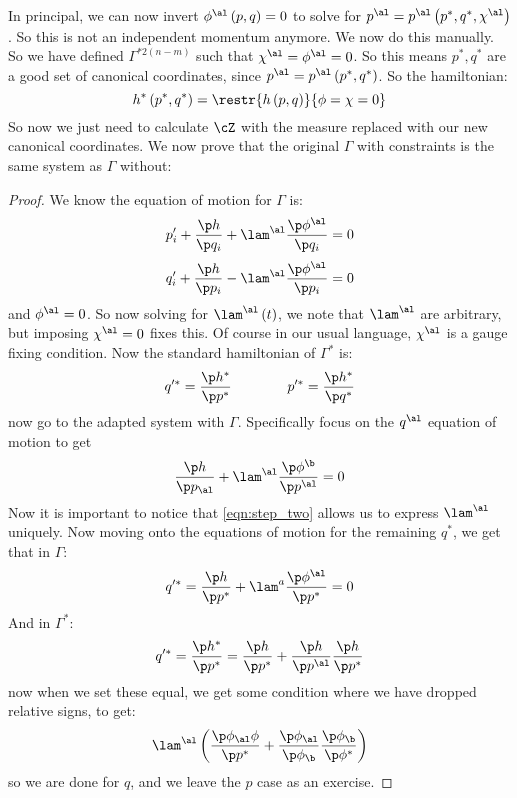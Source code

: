 \documentclass{booc}
\begin{document}
In principal, we can now invert $\phi^\al\left( p , q \right) = 0$ 
to solve for $p^\al = p^\al\left( p^* , q^* , \chi^\al \right)$. 
So this is not an independent momentum anymore.
We now do this manually.
So we have defined $\Gamma^{*2\left( n-m \right)}$ such that
$\chi^\al = \phi^\al = 0$. 
So this means $p^* , q^*$ are a good set of canonical coordinates, since
$p^\al = p^\al\left( p^* , q^* \right)$. 
So the hamiltonian:
\begin{equation}
h^*\left( p^* , q^* \right) = \restr{h\left( p , q \right)}
{\phi = \chi = 0}
\end{equation}
So now we just need to calculate $\cZ$ with the measure replaced with our new canonical coordinates.
We now prove that the original $\Gamma$ with constraints is the same system as $\Gamma$
without:
\begin{proof}
We know the equation of motion for $\Gamma$ is:
\begin{equation}
p_i' + \frac{\p h}{\p q_i} + 
\lam^\al \frac{\p\phi^\al}{\p q_i} = 0
\end{equation}
\begin{equation}
q_i' + \frac{\p h}{\p p_i} - 
\lam^\al \frac{\p \phi^\al}{\p p_i} = 0
\end{equation}
and $\phi^\al = 0$. 
So now solving for $\lam^\al\left( t \right)$, 
we note that $\lam^\al$ are arbitrary, but imposing $\chi^\al = 0$ fixes
this. Of course in our usual language, $\chi^\al$ is a gauge fixing condition.
Now the standard hamiltonian of $\Gamma^*$ is:
\begin{equation}
q'^* = 
\frac{\p h^*}{\p p^*}
\qquad\qquad
p'^* = 
\frac{\p h^*}{\p q^*}
\end{equation}
now go to the adapted system with $\Gamma$. 
Specifically focus on the $q^\al$ equation of motion to get
\begin{equation}
\frac{\p h}{\p p_\al} + 
\lam^\al \frac{\p \phi^\b}{\p p^\al} = 0
\end{equation}
Now it is important to notice that \eqref{eqn:step_two}
allows us to express $\lam^\al$ uniquely. 
Now moving onto the equations of motion for the remaining $q^*$,
we get that in $\Gamma$:
\begin{equation}
q'^* = 
\frac{\p h}{\p p^*} + 
\lam^a \frac{\p \phi^\al}{\p p^*} = 0
\end{equation}
And in $\Gamma^*$:
\begin{equation}
q'^* = \frac{\p h^*}{\p p^*} = 
\frac{\p h}{\p p^*} + 
\frac{\p h}{\p p^\al} 
\frac{\p h}{\p p^*}
\end{equation}
now when we set these equal, we get some condition where
we have dropped relative signs, to get:
\begin{equation}
\lam^\al\left( \frac{\p \phi_\al \phi}{\p p^*} + 
\frac{\p \phi_\al}{\p \phi_\b}
\frac{\p \phi_\b}{\p \phi^*}\right)
\end{equation}
so we are done for $q$, and we leave the $p$ case as an exercise.
\end{proof}
\end{document}
